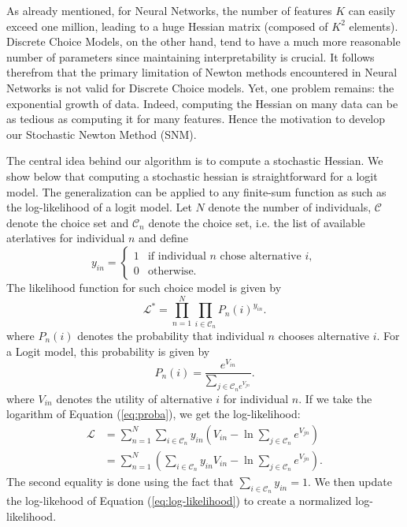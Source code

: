 \documentclass[conference]{IEEEtran}
\begin{document}
As already mentioned, for Neural Networks, the number of features $K$ can easily exceed one million, leading to a huge Hessian matrix (composed of $K^2$ elements). Discrete Choice Models, on the other hand, tend to have a much more reasonable number of parameters since maintaining interpretability is crucial. It follows therefrom that the primary limitation of Newton methods encountered in Neural Networks is not valid for Discrete Choice models. Yet, one problem remains: the exponential growth of data. Indeed, computing the Hessian on many data can be as tedious as computing it for many features. Hence the motivation to develop our Stochastic Newton Method (SNM).

The central idea behind our algorithm is to compute a stochastic Hessian. We show below that computing a stochastic hessian is straightforward for a logit model. The generalization can be applied to any finite-sum function as such as the log-likelihood of a logit model. Let $N$ denote the number of individuals, $\mathcal{C}$ denote the choice set and $\mathcal{C}_n$ denote the choice set, i.e. the list of available aterlatives for individual $n$ and define
\[
y_{in} = 
\begin{cases}
1 & \text{if individual $n$ chose alternative $i$}, \\
0 & \text{otherwise}.
\end{cases}
\]
The likelihood function for such choice model is given by
\begin{equation}
\mathcal{L}^* = \prod_{n=1}^N \prod_{i\in\mathcal{C}_n} P_n(i)^{y_{in}}.
\end{equation}
where $P_n(i)$ denotes the probability that individual $n$ chooses alternative $i$. For a Logit model, this probability is given by
\begin{equation}
\label{eq:proba}
P_n(i) = \frac{e^{V_{in}}}{\sum_{j\in\mathcal{C}_n e^{V_{jn}}}}.
\end{equation}
where $V_{in}$ denotes the utility of alternative $i$ for individual $n$. If we take the logarithm of Equation (\ref{eq:proba}), we get the log-likelihood:
\begin{align}
\label{eq:log-likelihood}
\mathcal{L} &= \sum_{n=1}^N\sum_{i\in\mathcal{C}_n} y_{in}\left( V_{in} - \ln \sum_{j\in\mathcal{C}_n}e^{V_{jn}} \right) \nonumber \\
&= \sum_{n=1}^N \left( \sum_{i\in\mathcal{C}_n} y_{in}V_{in} - \ln \sum_{j\in\mathcal{C}_n}e^{V_{jn}} \right).
\end{align}
The second equality is done using the fact that $\sum_{i\in\mathcal{C}_n} y_{in} = 1$. We then update the log-likehood of Equation (\ref{eq:log-likelihood}) to create a normalized log-likelihood.
\end{document}
